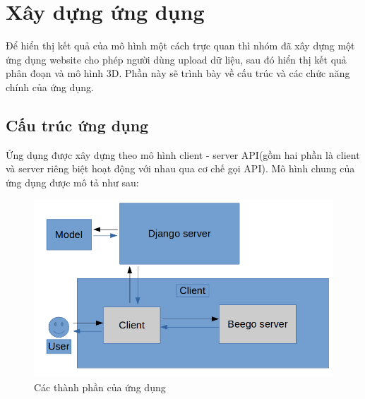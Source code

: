 \chapter{Xây dựng ứng dụng}
Để hiển thị kết quả của mô hình một cách trực quan thì nhóm đã xây dựng một ứng dụng website cho phép người dùng upload dữ liệu, sau đó hiển thị kết quả phân đoạn và mô hình 3D. Phần này sẽ trình bày về cấu trúc và các chức năng chính của ứng dụng.
\section{Cấu trúc ứng dụng}
Ứng dụng được xây dựng theo mô hình client - server API(gồm hai phần là client và server riêng biệt hoạt động với nhau qua cơ chế gọi API). 
Mô hình chung của ứng dụng được mô tả như sau:
\begin{figure}[h]
\centering
    \includegraphics[totalheight=7cm]{Images/app_struct.png}
    \caption{Các thành phần của ứng dụng}
    \label{skip_conn}
\end{figure}
